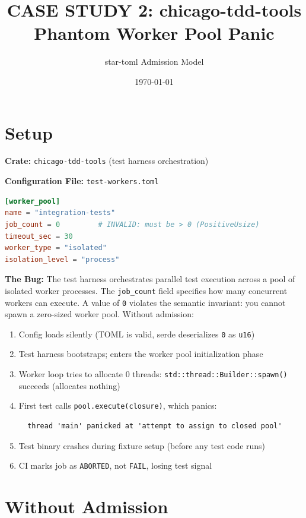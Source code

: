 \documentclass[11pt,a4paper]{article}
\title{CASE STUDY 2: chicago-tdd-tools Phantom Worker Pool Panic}
\author{star-toml Admission Model}
\date{\today}
\begin{document}
\maketitle

\section*{Setup}

\textbf{Crate:} \texttt{chicago-tdd-tools} (test harness orchestration)

\textbf{Configuration File:} \texttt{test-workers.toml}
\begin{lstlisting}[language=toml]
[worker_pool]
name = "integration-tests"
job_count = 0         # INVALID: must be > 0 (PositiveUsize)
timeout_sec = 30
worker_type = "isolated"
isolation_level = "process"
\end{lstlisting}

\textbf{The Bug:} The test harness orchestrates parallel test execution across a pool of isolated worker processes. The \texttt{job\_count} field specifies how many concurrent workers can execute. A value of \texttt{0} violates the semantic invariant: you cannot spawn a zero-sized worker pool. Without admission:

\begin{enumerate}
  \item Config loads silently (TOML is valid, serde deserializes \texttt{0} as \texttt{u16})
  \item Test harness bootstraps; enters the worker pool initialization phase
  \item Worker loop tries to allocate 0 threads: \texttt{std::thread::Builder::spawn()} succeeds (allocates nothing)
  \item First test calls \texttt{pool.execute(closure)}, which panics:
  \begin{Verbatim}
  thread 'main' panicked at 'attempt to assign to closed pool'
  \end{Verbatim}
  \item Test binary crashes during fixture setup (before any test code runs)
  \item CI marks job as \texttt{ABORTED}, not \texttt{FAIL}, losing test signal
\end{enumerate}

\section*{Without Admission}
\end{document}
